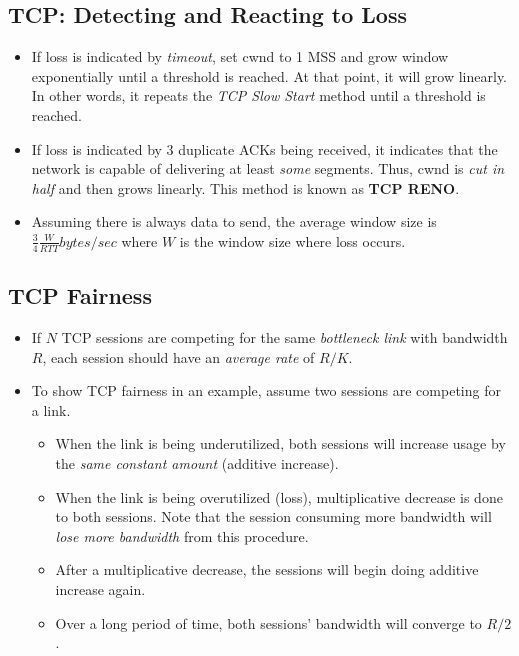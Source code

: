 \documentclass{article}
\begin{document}
\subsection{TCP: Detecting and Reacting to Loss}

\begin{itemize}
\item If loss is indicated by {\it timeout}, set cwnd to 1 MSS and grow window exponentially until a threshold is reached. At that point, it will grow linearly. In other words, it repeats the \emph{TCP Slow Start} method until a threshold is reached.
\item If loss is indicated by 3 duplicate ACKs being received, it indicates that the network is capable of delivering at least \emph{some} segments. Thus, cwnd is \emph{cut in half} and then grows linearly. This method is known as {\bf TCP RENO}.
\item Assuming there is always data to send, the average window size is $\frac{3}{4}\frac{W}{RTT}bytes/sec$ where $W$ is the window size where loss occurs.
\end{itemize}

\subsection{TCP Fairness}

\begin{itemize}
\item If $N$ TCP sessions are competing for the same \emph{bottleneck link} with bandwidth $R$, each session should have an \emph{average rate} of $R/K$.
\item To show TCP fairness in an example, assume two sessions are competing for a link.
\begin{itemize}
\item When the link is being underutilized, both sessions will increase usage by the \emph{same constant amount} (additive increase).
\item When the link is being overutilized (loss), multiplicative decrease is done to both sessions. Note that the session consuming more bandwidth will \emph{lose more bandwidth} from this procedure.
\item After a multiplicative decrease, the sessions will begin doing additive increase again.
\item Over a long period of time, both sessions' bandwidth will converge to $R/2$.
\end{itemize}
\end{itemize}
\end{document}
